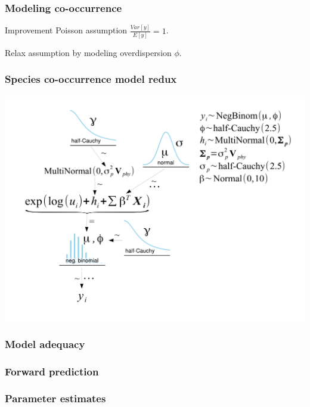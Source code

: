 \documentclass{beamer}
\begin{document}
\begin{frame}
  \frametitle{Modeling co-occurrence}
  \begin{block}{Improvement}
    Poisson assumption \(\frac{Var[y]}{E[y]} = 1\).

    Relax assumption by modeling overdispersion \(\phi\).
  \end{block}
\end{frame}

\begin{frame}
  \frametitle{Species co-occurrence model redux}
  \begin{center}
    \includegraphics[height = 0.8\textheight, width = \textwidth,  keepaspectratio = true]{figure/mammal_deg_over_model}
  \end{center}
\end{frame}

\begin{frame}
  \frametitle{Model adequacy}

\end{frame}

\begin{frame}
  \frametitle{Forward prediction}

\end{frame}

\begin{frame}
  \frametitle{Parameter estimates}

\end{frame}
\end{document}
